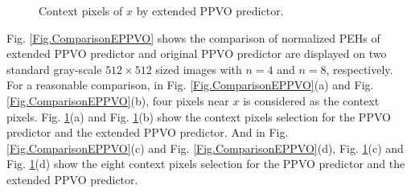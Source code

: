 \documentclass[review,3p,10pt,sort&compress]{elsarticle}
\begin{document}
\begin{figure}
\qquad\qquad
{}		
\centering
\caption{Context pixels of $x$ by extended PPVO predictor.}
\label{Fig.Context}
\end{figure}

Fig. \ref{Fig.ComparisonEPPVO} shows the comparison of normalized PEHs of extended PPVO predictor and original PPVO predictor are displayed on two standard gray-scale $512 \times 512$ sized images with $n = 4$ and $n = 8$, respectively. For a reasonable comparison, in Fig. \ref{Fig.ComparisonEPPVO}(a) and Fig. \ref{Fig.ComparisonEPPVO}(b), four pixels near $x$ is considered as the context pixels. Fig. \ref{Fig.Context}(a) and Fig. \ref{Fig.Context}(b) show the context pixels selection for the PPVO predictor and the extended PPVO predictor. And in Fig. \ref{Fig.ComparisonEPPVO}(c) and Fig. \ref{Fig.ComparisonEPPVO}(d), Fig. \ref{Fig.Context}(c) and Fig. \ref{Fig.Context}(d) show the eight context pixels selection for the PPVO predictor and the extended PPVO predictor.
\end{document}
